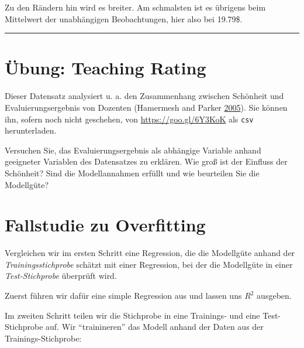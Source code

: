 \documentclass[12pt,]{book}
\makeatletter
\newenvironment{Shaded}{\begin{snugshade}}{\end{snugshade}}
\newcommand{\KeywordTok}[1]{\textcolor[rgb]{0.13,0.29,0.53}{\textbf{{#1}}}}
\newcommand{\DataTypeTok}[1]{\textcolor[rgb]{0.13,0.29,0.53}{{#1}}}
\newcommand{\StringTok}[1]{\textcolor[rgb]{0.31,0.60,0.02}{{#1}}}
\newcommand{\CommentTok}[1]{\textcolor[rgb]{0.56,0.35,0.01}{\textit{{#1}}}}
\newcommand{\NormalTok}[1]{{#1}}
\newenvironment{kframe}{%
\medskip{}
\setlength{\fboxsep}{.8em}
 \def\at@end@of@kframe{}%
 \ifinner\ifhmode%
  \def\at@end@of@kframe{\end{minipage}}%
  \begin{minipage}{\columnwidth}%
 \fi\fi%
 \def\FrameCommand##1{\hskip\@totalleftmargin \hskip-\fboxsep
 \colorbox{shadecolor}{##1}\hskip-\fboxsep
     \hskip-\linewidth \hskip-\@totalleftmargin \hskip\columnwidth}%
 \MakeFramed {\advance\hsize-\width
   \@totalleftmargin\z@ \linewidth\hsize
   \@setminipage}}%
 {\par\unskip\endMakeFramed%
 \at@end@of@kframe}
\renewenvironment{Shaded}{\begin{kframe}}{\end{kframe}}
\makeatother
\begin{document}
Zu den Rändern hin wird es breiter. Am schmalsten ist es übrigens beim
Mittelwert der unabhängigen Beobachtungen, hier also bei 19.79\$.

\begin{center}\rule{0.5\linewidth}{\linethickness}\end{center}

\section{Übung: Teaching Rating}\label{ubung-teaching-rating}

Dieser Datensatz analysiert u. a. den Zusammenhang zwischen Schönheit
und Evaluierungsergebnis von Dozenten (Hamermesh and Parker
\protect\hyperlink{ref-hamermesh2005beauty}{2005}). Sie können ihn,
sofern noch nicht geschehen, von \url{https://goo.gl/6Y3KoK} als
\texttt{csv} herunterladen.

Versuchen Sie, das Evaluierungsergebnis als abhängige Variable anhand
geeigneter Variablen des Datensatzes zu erklären. Wie groß ist der
Einfluss der Schönheit? Sind die Modellannahmen erfüllt und wie
beurteilen Sie die Modellgüte?

\hypertarget{overfitting_casestudy}{\section{Fallstudie zu
Overfitting}\label{overfitting_casestudy}}

Vergleichen wir im ersten Schritt eine Regression, die die Modellgüte
anhand der \emph{Trainingsstichprobe} schätzt mit einer Regression, bei
der die Modellgüte in einer \emph{Test-Stichprobe} überprüft wird.

Zuerst führen wir dafür eine simple Regression aus und lassen uns
\(R^2\) ausgeben.

\begin{Shaded}
\end{Shaded}

Im zweiten Schritt teilen wir die Stichprobe in eine Trainings- und eine
Test-Stichprobe auf. Wir ``trainineren'' das Modell anhand der Daten aus
der Trainings-Stichprobe:
\end{document}
